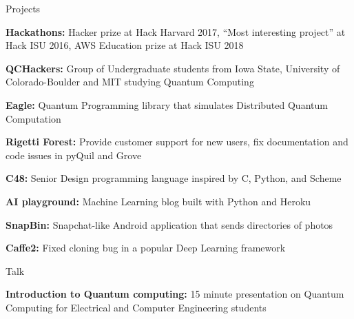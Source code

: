 \documentclass{resume} %
\begin{document}

\begin{rSection}{Projects}


{\bf Hackathons:} Hacker prize at Hack Harvard 2017, “Most interesting project” at Hack ISU 2016, AWS Education prize at Hack ISU 2018

{\bf QCHackers:}
Group of Undergraduate students from Iowa State, University of Colorado-Boulder and MIT studying Quantum Computing

{\bf Eagle:}
Quantum Programming library that simulates Distributed Quantum Computation

{\bf Rigetti Forest:}
Provide customer support for new users, fix documentation and code issues in pyQuil and Grove

{\bf C48:}
Senior Design programming language inspired by C, Python, and Scheme

{\bf AI playground:}
Machine Learning blog built with Python and Heroku

{\bf SnapBin:}
Snapchat-like Android application that sends directories of photos

{\bf Caffe2:}
Fixed cloning bug in a popular Deep Learning framework

\end{rSection}

\begin{rSection}{Talk}

{\bf Introduction to Quantum computing:}
15 minute presentation on Quantum Computing for Electrical and Computer Engineering students

\end{rSection}



\end{document}
